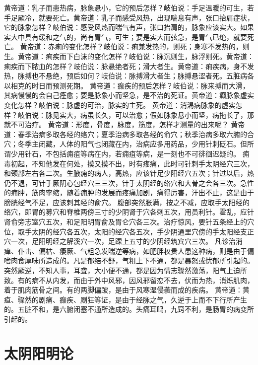 \documentclass[a4paper,12pt,UTF8,twoside]{ctexbook}
\begin{document}
黄帝道：乳子而患热病，脉象悬小，它的预后怎样？岐伯说：手足温暖的可生，若手足厥冷，就要死亡。黄帝道：乳子而感受风热，出现喘息有声，张口抬肩症状，它的脉象怎样？岐伯说：感受风热而喘气有声，张口抬肩的，脉象应该实大。如果实大中具有缓和之气的，尚有胃气，可生；要是实大而弦急，是胃气已绝，就要死亡。
黄帝道：赤痢的变化怎样？岐伯说：痢兼发热的，则死；身寒不发热的，则生。黄帝道：痢疾而下白沫的变化怎样？岐伯说：脉沉则生，脉浮则死。黄帝道：痢疾而下脓血的怎样？岐伯说：脉悬绝者死；滑大者生。黄帝道：痢疾病，身不发热，脉搏也不悬绝，预后如何？岐伯说：脉搏滑大者生；脉搏悬涩者死。五脏病各以相克的时日而预测死期。
黄帝道：癫疾的预后怎样？岐伯说：脉来搏而大滑，其病慢慢的会自己痊愈；要是脉象小而坚急，是不治的死证。黄帝道：癫脉象虚实变化怎样？岐伯说：脉虚的可治，脉实的主死。
黄帝道：消渴病脉象的虚实怎样？岐伯说：脉见实大，病虽长久，可以治愈；假如脉象悬小而坚，病拖长了，那就不可治疗。
黄帝道：形度，骨度，脉度，筋度，怎样才测量的出来呢？
黄帝道：春季治病多取各经的络穴；夏季治病多取各经的俞穴；秋季治病多取六腑的合穴；冬季主闭藏，人体的阳气也闭藏在内，治病应多用药品，少用针刺砭石。但所谓少用针石，不包括痈疽等病在内，若痈疽等病，是一刻也不可徘徊迟疑的。
痈毒初起，不知他发在何处，摸又摸不出，时有疼痛，此时可针刺手太阴经穴三次，和颈部左右各二次。生腋痈的病人，高热，应该针足少阳经穴五次；针过以后，热仍不退，可针手厥阴心包经穴三三次，针手太阴经的络穴和大骨之会各三次。急性的痈肿，筋肉挛缩，随着痈肿的发展而疼痛加剧，痛得厉害，汗出不止，这是由于膀胱经气不足，应该刺其经的俞穴。
腹部突然胀满，按之不减，应取手太阳经的络穴，即胃的募穴和脊椎两傍三寸的少阴肾于穴各刺五次，用员利针。霍乱，应针肾俞旁志室穴五次，和足阳明胃俞及胃仑穴各三次。治疗惊风，要针五条经上的穴位，取手太阴的经穴各五次，太阳的经穴各五次，手少阴通里穴傍的手太阳经支正穴一次，足阳明经之解溪穴一次，足踝上五寸的少阴经筑宾穴三次。
凡诊治消瘅、仆击、偏枯、痿厥、气粗急发喘逆等病，如肥胖权贵人患这种病，则是由于偏嗜肉食厚味所造成的。凡是郁结不舒，气粗上下不通，都是暴怒或忧郁所引起的。突然厥逆，不知人事，耳聋，大小便不通，都是因为情志骤然激荡，阳气上迫所致。有的病不从内发，而由于外中风邪，因风邪留恋不去，伏而为热，消烁肌肉，着于肌肉筋骨之间。有的两脚偏跛，是由于风寒湿侵袭而成的疾病。
黄帝道：黄疸、骤然的剧痛、癫疾、劂狂等证，是由于经脉之气，久逆于上而不下行所产生的。五脏不和，是六腑闭塞不通所造成的。头痛耳鸣，九窍不利，是肠胃的病变所引起的。

\chapter{太阴阳明论}
\end{document}
